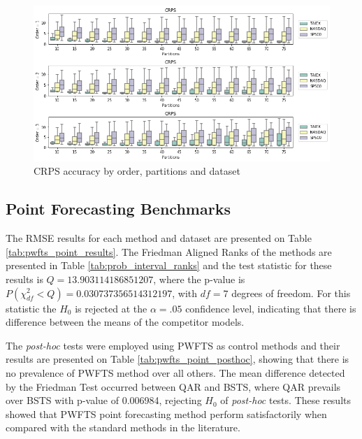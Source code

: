 \begin{figure}[htb]
    \centering
    \includegraphics[width=\textwidth]{figures/pwfts_gridsearch_probabilistic.png}
    \caption{CRPS accuracy by order, partitions and dataset}
    \label{fig:pwfts_gridsearch_probabilistic}
\end{figure}


\subsection{Point Forecasting Benchmarks}
\label{sec:pwfts_experiments_point}

The RMSE results for each method and dataset are presented on Table \ref{tab:pwfts_point_results}. The Friedman Aligned Ranks of the methods are presented in Table \ref{tab:prob_interval_ranks} and the test statistic for these results is $Q = 13.903114186851207$, where the p-value is $P(\chi^2_{df} < Q) = 0.030737356514312197$, with $df=7$ degrees of freedom. For this statistic the $H_0$ is rejected at the $\alpha=.05$ confidence level, indicating that there is difference between the means of the competitor models.

The \textit{post-hoc} tests were employed using PWFTS as control methods and their results are presented on Table \ref{tab:pwfts_point_posthoc}, showing that there is no prevalence of PWFTS method over all others. The mean difference detected by the Friedman Test occurred between QAR and BSTS, where QAR prevails over BSTS with p-value of 0.006984, rejecting $H_0$ of \textit{post-hoc} tests. These results showed that PWFTS point forecasting method perform satisfactorily when compared with the standard methods in the literature. 

